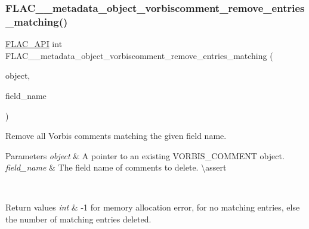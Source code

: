 \subsubsection{\texorpdfstring{FLAC\_\_metadata\_object\_vorbiscomment\_remove\_entries\_matching()}{FLAC\_\_metadata\_object\_vorbiscomment\_remove\_entries\_matching()}}
{\footnotesize\ttfamily \mbox{\hyperlink{group__flac__export_ga56ca07df8a23310707732b1c0007d6f5}{F\+L\+A\+C\+\_\+\+A\+PI}} int F\+L\+A\+C\+\_\+\+\_\+metadata\+\_\+object\+\_\+vorbiscomment\+\_\+remove\+\_\+entries\+\_\+matching (\begin{DoxyParamCaption}\item[{\mbox{\hyperlink{struct_f_l_a_c_____stream_metadata}{F\+L\+A\+C\+\_\+\+\_\+\+Stream\+Metadata}} $\ast$}]{object,  }\item[{const char $\ast$}]{field\+\_\+name }\end{DoxyParamCaption})}

Remove all Vorbis comments matching the given field name.


\begin{DoxyParams}{Parameters}
{\em object} & A pointer to an existing V\+O\+R\+B\+I\+S\+\_\+\+C\+O\+M\+M\+E\+NT object. \\
\hline
{\em field\+\_\+name} & The field name of comments to delete. \textbackslash{}assert 
\begin{DoxyCode}{1}
\end{DoxyCode}
 
\begin{DoxyCode}{1}
\end{DoxyCode}
 \\
\hline
\end{DoxyParams}

\begin{DoxyRetVals}{Return values}
{\em int} & {\ttfamily -\/1} for memory allocation error, {} for no matching entries, else the number of matching entries deleted. \\
\hline
\end{DoxyRetVals}
\mbox{\label{group__flac__metadata__object_ga6812052a110800bef2f4139017501507}} 
